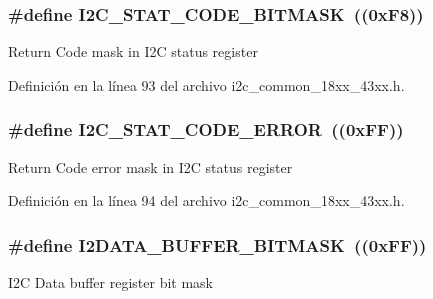 \subsubsection[{\texorpdfstring{I2\+C\+\_\+\+S\+T\+A\+T\+\_\+\+C\+O\+D\+E\+\_\+\+B\+I\+T\+M\+A\+SK}{I2C_STAT_CODE_BITMASK}}]{\setlength{\rightskip}{0pt plus 5cm}\#define I2\+C\+\_\+\+S\+T\+A\+T\+\_\+\+C\+O\+D\+E\+\_\+\+B\+I\+T\+M\+A\+SK~((0x\+F8))}\hypertarget{group___i2_c__18_x_x__43_x_x_gafeb8b5f682a81a2cc32f6c4b720a5e1f}{}\label{group___i2_c__18_x_x__43_x_x_gafeb8b5f682a81a2cc32f6c4b720a5e1f}
Return Code mask in I2C status register 

Definición en la línea 93 del archivo i2c\+\_\+common\+\_\+18xx\+\_\+43xx.\+h.

\subsubsection[{\texorpdfstring{I2\+C\+\_\+\+S\+T\+A\+T\+\_\+\+C\+O\+D\+E\+\_\+\+E\+R\+R\+OR}{I2C_STAT_CODE_ERROR}}]{\setlength{\rightskip}{0pt plus 5cm}\#define I2\+C\+\_\+\+S\+T\+A\+T\+\_\+\+C\+O\+D\+E\+\_\+\+E\+R\+R\+OR~((0x\+F\+F))}\hypertarget{group___i2_c__18_x_x__43_x_x_gacfbf48ab1ed4f43314f63898ac827925}{}\label{group___i2_c__18_x_x__43_x_x_gacfbf48ab1ed4f43314f63898ac827925}
Return Code error mask in I2C status register 

Definición en la línea 94 del archivo i2c\+\_\+common\+\_\+18xx\+\_\+43xx.\+h.

\subsubsection[{\texorpdfstring{I2\+D\+A\+T\+A\+\_\+\+B\+U\+F\+F\+E\+R\+\_\+\+B\+I\+T\+M\+A\+SK}{I2DATA_BUFFER_BITMASK}}]{\setlength{\rightskip}{0pt plus 5cm}\#define I2\+D\+A\+T\+A\+\_\+\+B\+U\+F\+F\+E\+R\+\_\+\+B\+I\+T\+M\+A\+SK~((0x\+F\+F))}\hypertarget{group___i2_c__18_x_x__43_x_x_ga95d605cbb817fa36d9c83545dd23fb5f}{}\label{group___i2_c__18_x_x__43_x_x_ga95d605cbb817fa36d9c83545dd23fb5f}
I2C Data buffer register bit mask 


